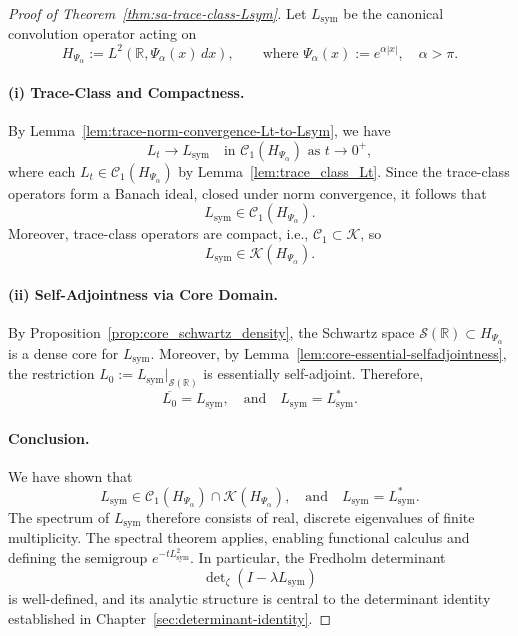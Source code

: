 \begin{proof}[Proof of Theorem~\ref{thm:sa-trace-class-Lsym}]
Let \( L_{\mathrm{sym}} \) be the canonical convolution operator acting on
\[
H_{\Psi_\alpha} := L^2(\mathbb{R}, \Psi_\alpha(x)\, dx), \qquad \text{where } \Psi_\alpha(x) := e^{\alpha |x|}, \quad \alpha > \pi.
\]

\paragraph{(i) Trace-Class and Compactness.}
By Lemma~\ref{lem:trace-norm-convergence-Lt-to-Lsym}, we have
\[
L_t \to L_{\mathrm{sym}} \quad \text{in } \mathcal{C}_1(H_{\Psi_\alpha}) \text{ as } t \to 0^+,
\]
where each \( L_t \in \mathcal{C}_1(H_{\Psi_\alpha}) \) by Lemma~\ref{lem:trace_class_Lt}. Since the trace-class operators form a Banach ideal, closed under norm convergence, it follows that
\[
L_{\mathrm{sym}} \in \mathcal{C}_1(H_{\Psi_\alpha}).
\]
Moreover, trace-class operators are compact, i.e., \( \mathcal{C}_1 \subset \mathcal{K} \), so
\[
L_{\mathrm{sym}} \in \mathcal{K}(H_{\Psi_\alpha}).
\]

\paragraph{(ii) Self-Adjointness via Core Domain.}
By Proposition~\ref{prop:core_schwartz_density}, the Schwartz space \( \mathcal{S}(\mathbb{R}) \subset H_{\Psi_\alpha} \) is a dense core for \( L_{\mathrm{sym}} \). Moreover, by Lemma~\ref{lem:core-essential-selfadjointness}, the restriction \( L_0 := L_{\mathrm{sym}}|_{\mathcal{S}(\mathbb{R})} \) is essentially self-adjoint. Therefore,
\[
\overline{L_0} = L_{\mathrm{sym}}, \quad \text{and} \quad L_{\mathrm{sym}} = L_{\mathrm{sym}}^*.
\]

\paragraph{Conclusion.}
We have shown that
\[
L_{\mathrm{sym}} \in \mathcal{C}_1(H_{\Psi_\alpha}) \cap \mathcal{K}(H_{\Psi_\alpha}), \quad \text{and} \quad L_{\mathrm{sym}} = L_{\mathrm{sym}}^*.
\]
The spectrum of \( L_{\mathrm{sym}} \) therefore consists of real, discrete eigenvalues of finite multiplicity. The spectral theorem applies, enabling functional calculus and defining the semigroup \( e^{-t L_{\mathrm{sym}}^2} \). In particular, the Fredholm determinant
\[
\det\nolimits_\zeta(I - \lambda L_{\mathrm{sym}})
\]
is well-defined, and its analytic structure is central to the determinant identity established in Chapter~\ref{sec:determinant-identity}.
\end{proof}
% 
